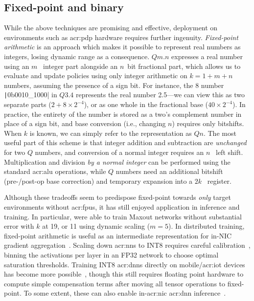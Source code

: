 \subsection{Fixed-point and binary}
While the above techniques are promising and effective, deployment on environments such as \gls{acr:pdp} hardware requires further ingenuity.
\emph{Fixed-point arithmetic} is an approach which makes it possible to represent real numbers as integers, losing dynamic range as a consequence.
$Qm.n$ expresses a real number using an $m$~\unit{\bit} integer part alongside an $n$~\unit{bit} fractional part, which allows us to evaluate and update policies using only integer arithmetic on $k=1+m+n$~\unit{\bit} numbers, assuming the presence of a sign bit.
For instance, the \qty{8}{\bit} number \texttt|0b0010_1000| in $Q3.4$ represents the real number \num{2.5}---we can view this as two separate parts ($2 + 8\times2^{-4}$), or as one whole in the fractional base ($40\times2^{-4}$).
In practice, the entirety of the number is stored as a two's complement number in place of a sign bit, and base conversion (i.e., changing $n$) requires only bitshifts.
When $k$ is known, we can simply refer to the representation as $Qn$.
The most useful part of this scheme is that integer addition and subtraction are \emph{unchanged} for two $Q$ numbers, and conversion of a normal integer requires an $n$~\unit{\bit} left shift.
Multiplication and division \emph{by a normal integer} can be performed using the standard \gls{acr:alu} operations, while $Q$ numbers need an additional bitshift (pre-/post-op base correction) and temporary expansion into a $2k$~\unit{\bit} register.

Although these tradeoffs seem to predispose fixed-point towards \emph{only} target environments without \glspl{acr:fpu}, it has still enjoyed application in inference and training.
In particular, \textcite{DBLP:journals/corr/CourbariauxBD14} were able to train Maxout networks without substantial error with $k$ at \qty{19}{\bit}, or \qty{11}{\bit} using dynamic scaling ($m=5$).
In distributed training, fixed-point arithmetic is useful as an intermediate representation for in-NIC gradient aggregation~\parencite{DBLP:conf/nsdi/SapioC0NKKKMPR21,DBLP:conf/nsdi/LaoLMCWAS21}.
Scaling down \glspl{acr:nn} to INT8 requires careful calibration~\parencite{tensorrt-8bit}, binning the activations per layer in an FP32 network to choose optimal saturation thresholds.
Training INT8 \glspl{acr:dnn} directly on mobile/\gls{acr:iot} devices has become more possible~\parencite{DBLP:conf/usenix/Zhou0QGXZGLZ21}, though this still requires floating point hardware to compute simple compensation terms after moving all tensor operations to fixed-point.
To some extent, these can also enable in-\gls{acr:nic} \gls{acr:dnn} inference~\parencite{langlet-ml-netronome}.

